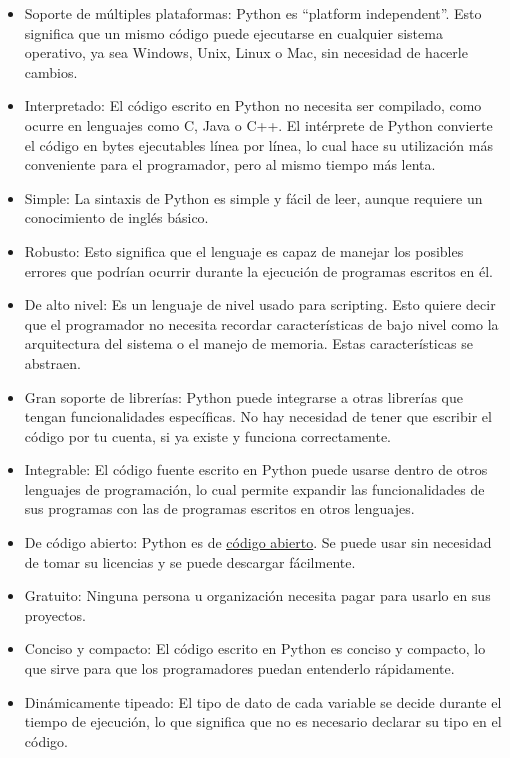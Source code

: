\documentclass{report}
\newcommand{\doble}[1]{``#1''}
\newcommand{\link}[2]{\href{#1}{\underline{#2}}}
\begin{document}
\begin{itemize}
  \item Soporte de múltiples plataformas: Python es \doble{platform independent}. Esto significa que un mismo código puede ejecutarse en cualquier sistema operativo, ya sea Windows, Unix, Linux o Mac, sin necesidad de hacerle cambios.
  
  \item Interpretado: El código escrito en Python no necesita ser compilado, como ocurre en lenguajes como C, Java o C++. El intérprete de Python convierte el código en bytes ejecutables línea por línea, lo cual hace su utilización más conveniente para el programador, pero al mismo tiempo más lenta.
  
  \item Simple: La sintaxis de Python es simple y fácil de leer, aunque requiere un conocimiento de inglés básico.
  
  \item Robusto: Esto significa que el lenguaje es capaz de manejar los posibles errores que podrían ocurrir durante la ejecución de programas escritos en él.
  
  \item De alto nivel: Es un lenguaje de nivel usado para scripting. Esto quiere decir que el programador no necesita recordar características de bajo nivel como la arquitectura del sistema o el manejo de memoria. Estas características se abstraen.
  
  \item Gran soporte de librerías: Python puede integrarse a otras librerías que tengan funcionalidades específicas. No hay necesidad de tener que escribir el código por tu cuenta, si ya existe y funciona correctamente.
  
  \item Integrable: El código fuente escrito en Python puede usarse dentro de otros lenguajes de programación, lo cual permite expandir las funcionalidades de sus programas con las de programas escritos en otros lenguajes.
  
  \item De código abierto: Python es de \link{https://opensource.org/about}{código abierto}. Se puede usar sin necesidad de tomar su licencias y se puede descargar fácilmente.
  
  \item Gratuito: Ninguna persona u organización necesita pagar para usarlo en sus proyectos.
  
  \item Conciso y compacto: El código escrito en Python es conciso y compacto, lo que sirve para que los programadores puedan entenderlo rápidamente.
  
  \item Dinámicamente tipeado: El tipo de dato de cada variable se decide durante el tiempo de ejecución, lo que significa que no es necesario declarar su tipo en el código.
  
\end{itemize}
\end{document}
